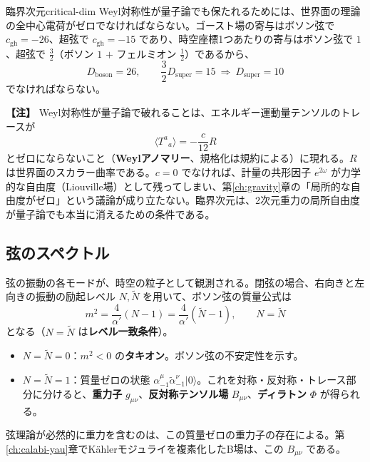 \documentclass[uplatex, dvipdfmx, book]{jsbook}
\let\origsubsection\subsection
\let\origsubsubsection\subsubsection
\renewcommand{\section}{\origsubsection}
\renewcommand{\subsection}{\origsubsubsection}
\renewcommand{\subsubsection}{\paragraph}
\newenvironment{note}{\vspace{1ex}\par\footnotesize\noindent\textbf{【注】}}{\par\vspace{1ex}}
\begin{document}
\begin{myprop}{臨界次元}{critical-dim}
Weyl対称性が量子論でも保たれるためには、世界面の理論の全中心電荷がゼロでなければならない。ゴースト場の寄与はボソン弦で $c_{\text{gh}} = -26$、超弦で $c_{\text{gh}} = -15$ であり、時空座標1つあたりの寄与はボソン弦で $1$、超弦で $\frac{3}{2}$（ボソン $1$ $+$ フェルミオン $\frac{1}{2}$）であるから、
\begin{equation*}
    D_{\text{boson}} = 26, \qquad \frac{3}{2}D_{\text{super}} = 15 \ \Rightarrow\ D_{\text{super}} = 10
\end{equation*}
でなければならない。
\end{myprop}

\begin{note}
Weyl対称性が量子論で破れることは、エネルギー運動量テンソルのトレースが
\begin{equation*}
    \langle T^a{}_a \rangle = -\frac{c}{12}R
\end{equation*}
とゼロにならないこと（\textbf{Weylアノマリー}、規格化は規約による）に現れる。$R$ は世界面のスカラー曲率である。$c = 0$ でなければ、計量の共形因子 $e^{2\omega}$ が力学的な自由度（Liouville場）として残ってしまい、第\ref{ch:gravity}章の「局所的な自由度がゼロ」という議論が成り立たない。臨界次元は、2次元重力の局所自由度が量子論でも本当に消えるための条件である。
\end{note}

\section{弦のスペクトル}

弦の振動の各モードが、時空の粒子として観測される。閉弦の場合、右向きと左向きの振動の励起レベル $N, \tilde{N}$ を用いて、ボソン弦の質量公式は
\begin{equation}
    m^2 = \frac{4}{\alpha'}(N - 1) = \frac{4}{\alpha'}(\tilde{N} - 1), \qquad N = \tilde{N}
\end{equation}
となる（$N = \tilde{N}$ は\textbf{レベル一致条件}）。
\begin{itemize}
    \item $N = \tilde{N} = 0$：$m^2 < 0$ の\textbf{タキオン}。ボソン弦の不安定性を示す。
    \item $N = \tilde{N} = 1$：質量ゼロの状態 $\alpha^\mu_{-1}\tilde{\alpha}^\nu_{-1}|0\rangle$。これを対称・反対称・トレース部分に分けると、\textbf{重力子} $g_{\mu\nu}$、\textbf{反対称テンソル場} $B_{\mu\nu}$、\textbf{ディラトン} $\Phi$ が得られる。
\end{itemize}
弦理論が必然的に重力を含むのは、この質量ゼロの重力子の存在による。第\ref{ch:calabi-yau}章でK\"ahlerモジュライを複素化したB場は、この $B_{\mu\nu}$ である。
\end{document}

